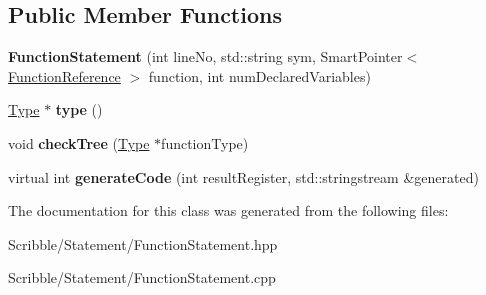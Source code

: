 \subsection*{Public Member Functions}
\begin{DoxyCompactItemize}
\item 
\hypertarget{class_function_statement_a18700760bb98b3598dd7a1753bd9ed73}{{\bfseries Function\-Statement} (int line\-No, std\-::string sym, Smart\-Pointer$<$ \hyperlink{class_function_reference}{Function\-Reference} $>$ function, int num\-Declared\-Variables)}\label{class_function_statement_a18700760bb98b3598dd7a1753bd9ed73}

\item 
\hypertarget{class_function_statement_a0c97a329d507841376ad3fd6911b0ec2}{\hyperlink{class_type}{Type} $\ast$ {\bfseries type} ()}\label{class_function_statement_a0c97a329d507841376ad3fd6911b0ec2}

\item 
\hypertarget{class_function_statement_a8bc3822e145410763184f8f637eeeb7d}{void {\bfseries check\-Tree} (\hyperlink{class_type}{Type} $\ast$function\-Type)}\label{class_function_statement_a8bc3822e145410763184f8f637eeeb7d}

\item 
\hypertarget{class_function_statement_a1683af67b51efaeff0e0cb7b737e2b8c}{virtual int {\bfseries generate\-Code} (int result\-Register, std\-::stringstream \&generated)}\label{class_function_statement_a1683af67b51efaeff0e0cb7b737e2b8c}

\end{DoxyCompactItemize}


The documentation for this class was generated from the following files\-:\begin{DoxyCompactItemize}
\item 
Scribble/\-Statement/Function\-Statement.\-hpp\item 
Scribble/\-Statement/Function\-Statement.\-cpp\end{DoxyCompactItemize}
